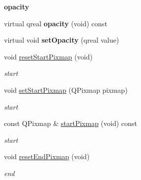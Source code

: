 \begin{Indent}\textbf{ opacity}\par
\begin{DoxyCompactItemize}
\item 
\mbox{\label{class_transition_widget_a0afd25c4b22e90167e1073228e64f47b}} 
virtual qreal {\bfseries opacity} (void) const
\item 
\mbox{\label{class_transition_widget_a2b05734b9ec7dbab48abd2cc078c8239}} 
virtual void {\bfseries set\+Opacity} (qreal value)
\item 
\mbox{\label{class_transition_widget_aa3bcc3cf2afa7c5a37454e9c4f432751}} 
void \hyperlink{class_transition_widget_aa3bcc3cf2afa7c5a37454e9c4f432751}{reset\+Start\+Pixmap} (void)
\begin{DoxyCompactList}\small\item\em start \end{DoxyCompactList}\item 
\mbox{\label{class_transition_widget_a3538ee02833e78dd032240fff282e734}} 
void \hyperlink{class_transition_widget_a3538ee02833e78dd032240fff282e734}{set\+Start\+Pixmap} (Q\+Pixmap pixmap)
\begin{DoxyCompactList}\small\item\em start \end{DoxyCompactList}\item 
\mbox{\label{class_transition_widget_a75bad1d8284a45158093e3311662a041}} 
const Q\+Pixmap \& \hyperlink{class_transition_widget_a75bad1d8284a45158093e3311662a041}{start\+Pixmap} (void) const
\begin{DoxyCompactList}\small\item\em start \end{DoxyCompactList}\item 
\mbox{\label{class_transition_widget_af1f618a49f4ce8798b4dad814aa9238c}} 
void \hyperlink{class_transition_widget_af1f618a49f4ce8798b4dad814aa9238c}{reset\+End\+Pixmap} (void)
\begin{DoxyCompactList}\small\item\em end \end{DoxyCompactList}\item 

\end{DoxyCompactItemize}
\end{Indent}
